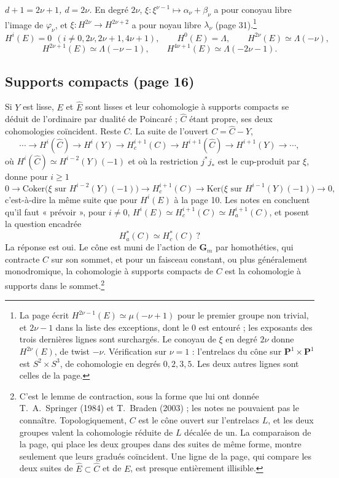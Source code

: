 \documentclass[11pt,a4paper]{article}
\begin{document}
\emph{$d + 1 = 2\nu + 1$, $d = 2\nu$.} En degré $2\nu$,
$\xi : \xi^{\nu-1} \mapsto \alpha_{\nu} + \beta_{\nu}$ a pour conoyau
libre l'image de $\varphi_{\nu}$, et
$\xi : H^{2\nu} \to H^{2\nu+2}$ a pour noyau libre $\lambda_{\nu}$ (page 31).\footnote{La page écrit $H^{2\nu-1}(E) \simeq \mu(-\nu+1)$ pour le premier
groupe non trivial, et $2\nu - 1$ dans la liste des exceptions, dont le
$0$ est entouré ; les exposants des trois dernières lignes sont surchargés.
Le conoyau de $\xi$ en degré $2\nu$ donne $H^{2\nu}(E)$, de twist
$-\nu$. Vérification sur $\nu = 1$ : l'entrelacs du cône sur
$\mathbf{P}^{1} \times \mathbf{P}^{1}$ est $S^{2} \times S^{3}$, de
cohomologie en degrés $0, 2, 3, 5$. Les deux autres lignes sont celles de
la page.}
\[
  H^{i}(E) = 0 \ \ (i \neq 0, 2\nu, 2\nu + 1, 4\nu + 1), \qquad
  H^{0}(E) = \Lambda, \qquad H^{2\nu}(E) \simeq \Lambda(-\nu),
\]
\[
  H^{2\nu+1}(E) \simeq \Lambda(-\nu-1), \qquad H^{4\nu+1}(E) \simeq \Lambda(-2\nu-1) .
\]

\subsection*{Supports compacts (page 16)}

Si $Y$ est lisse, $E$ et $\widehat{E}$ sont lisses et leur cohomologie à
supports compacts se déduit de l'ordinaire par dualité de Poincaré ;
$\widehat{C}$ étant propre, ses deux cohomologies coïncident. Reste $C$.
La suite de l'ouvert $C = \widehat{C} - Y$,
\[
  \cdots \to H^{i}(\widehat{C}) \to H^{i}(Y) \to H^{i+1}_{c}(C) \to
  H^{i+1}(\widehat{C}) \to H^{i+1}(Y) \to \cdots,
\]
où $H^{i}(\widehat{C}) \simeq H^{i-2}(Y)(-1)$ et où la restriction
$j^{*}j_{*}$ est le cup-produit par $\xi$, donne pour $i \geq 1$
\[
  0 \to \mathrm{Coker}\bigl(\xi \text{ sur } H^{i-2}(Y)(-1)\bigr) \to
  H^{i+1}_{c}(C) \to \mathrm{Ker}\bigl(\xi \text{ sur } H^{i-1}(Y)(-1)\bigr) \to 0,
\]
c'est-à-dire la même suite que pour $H^{i}(E)$ à la page 10. Les notes en
concluent qu'il faut « prévoir », pour $i \neq 0$,
$H^{i}(E) \simeq H^{i+1}_{c}(C) \simeq H^{i+1}_{a}(C)$, et posent la
question encadrée
\[
  H^{*}_{a}(C) \simeq H^{*}_{c}(C) \ ?
\]
La réponse est oui. Le cône est muni de l'action de $\mathbf{G}_{m}$ par
homothéties, qui contracte $C$ sur son sommet, et pour un faisceau
constant, ou plus généralement monodromique, la cohomologie à supports
compacts de $C$ est la cohomologie à supports dans le sommet.\footnote{C'est
le lemme de contraction, sous la forme que lui ont donnée T.~A.~Springer
(1984) et T.~Braden (2003) ; les notes ne pouvaient pas le connaître.
Topologiquement, $C$ est le cône ouvert sur l'entrelacs $L$, et les deux
groupes valent la cohomologie réduite de $L$ décalée de un. La comparaison
de la page, qui place les deux groupes dans des suites de même forme,
montre seulement que leurs gradués coïncident. Une ligne de la page,
qui compare les deux suites de $\widehat{E} \subset \widehat{C}$ et de
$E$, est presque entièrement illisible.}
\end{document}
